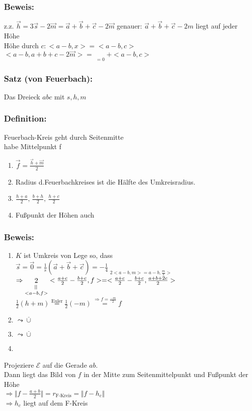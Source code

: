 \subsubsection{Beweis:}
z.z. $\vec{h}=3\vec{s}-2\vec{m}=\vec{a}+\vec{b}+\vec{c}-2\vec{m}$
genauer: $\vec{a}+\vec{b}+\vec{c}-2m$ liegt auf jeder Höhe\\
Höhe durch $c: <a-b,x>=<a-b,c>$\\
$<a-b,a+b+c-2\vec{m}>=\mathop{\underbrace{<a-b,a+b>-<a-b,2\vec{m}>}}\limits_{=0}+<a-b,c>$
%
%
%
\subsubsection{Satz (von Feuerbach):}
Das Dreieck $abc$ mit $s,h,m$\\
%
%
\subsubsection{Definition:}
Feuerbach-Kreis geht durch Seitenmitte\\
habe Mittelpunkt f
\begin{enumerate}
	\item $\vec{f}=\frac{\vec{h}+\vec{m}}{2}$
	\item Radius d.Feuerbachkreises ist die Hälfte des Umkreisradius. 
	\item $\frac{h+a}{2} , \, \frac{b+h}{2}, \, \frac{h+c}{2}$
	\item Fußpunkt der Höhen auch
\end{enumerate}
%
%
%
\subsubsection{Beweis:}
\begin{enumerate}
	\item $K$ ist Umkreis von %
	Lege so, dass $\vec{s}=\vec{0}=\frac{1}{s}(\vec{a}+\vec{b}+\vec{c})=-\frac{1}{4} 
	\mathop{\underbrace{<a-b,a+b>}}\limits_{2<a-b,m>=a-b,\frac{m}{s}>}$\\
	$\Rightarrow \mathop{2}\limits_{\mathop{<a-b,f>}\limits^{\rotatebox{90}
	{=}}}<\frac{a+c}{2}-\frac{b+c}{2},f>=<\frac{a+c}{2}-\frac{b+c}{2},\frac{a+b+2c}{2}>$\\
	$\frac{1}{2} (h+m) \mathop{=}\limits^{\text{Euler}}\frac{1}{2}(-
	m)\mathop{=}\limits^{\Rightarrow f = \frac{-m}{2}} f$
	\item $\leadsto \mathop{\cup}\limits^{\_}$
	\item $\leadsto \mathop{\cup}\limits^{\_}$
	\item %
\end{enumerate}
Projeziere $\mathcal{E}$ auf die Gerade $ab$. \\
Dann liegt das Bild von $f$ in der Mitte zum Seitenmittelpunkt und Fußpunkt der Höhe\\
$\Rightarrow \Vert f-\frac{a+b}{2}\Vert = r_{\text{F-Kreis}}=\Vert f-h_{c} \Vert$\\
$\Rightarrow h_{c}$ liegt auf dem F-Kreis